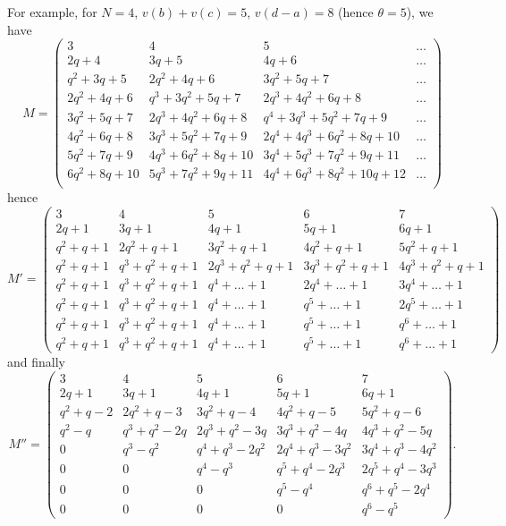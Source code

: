 \begin{example}
  For example, for $N = 4$, $v(b)+v(c)=5$, $v(d-a) = 8$ (hence $\theta=5$), we have
  \[ M = \begin{pmatrix}
    3 & 4 & 5 & \dots \\
    2q + 4 & 3q + 5 & 4q + 6 & \dots \\
    q^{2} + 3q + 5 & 2q^{2} + 4q + 6 & 3q^{2} + 5q + 7 & \dots \\
    2q^{2} + 4q + 6 & q^{3} + 3q^{2} + 5q + 7 & 2q^{3} + 4q^{2} + 6q + 8 & \dots \\
    3q^{2} + 5q + 7 & 2q^{3} + 4q^{2} + 6q + 8 & q^{4} + 3q^{3} + 5q^{2} + 7q + 9 & \dots \\
    4q^{2} + 6q + 8 & 3q^{3} + 5q^{2} + 7q + 9 & 2q^{4} + 4q^{3} + 6q^{2} + 8q + 10 & \dots \\
    5q^{2} + 7q + 9 & 4q^{3} + 6q^{2} + 8q + 10 & 3q^{4} + 5q^{3} + 7q^{2} + 9q + 11 & \dots \\
    6q^{2} + 8q + 10 & 5q^{3} + 7q^{2} + 9q + 11 & 4q^{4} + 6q^{3} + 8q^{2} + 10q + 12 & \dots \\
    \end{pmatrix} \]
  hence
  \[ M' = \begin{pmatrix}
    3 & 4 & 5 & 6 & 7 \\
    2q + 1 & 3q + 1 & 4q + 1 & 5q + 1 & 6q + 1 \\
    q^{2} + q + 1 & 2q^{2} + q + 1 & 3q^{2} + q + 1 & 4q^{2} + q + 1 & 5q^{2} + q + 1 \\
    q^{2} + q + 1 & q^{3} + q^{2} + q + 1 & 2q^{3} + q^{2} + q + 1 & 3q^{3} + q^{2} + q + 1 & 4q^{3} + q^{2} + q + 1 \\
    q^{2} + q + 1 & q^{3} + q^{2} + q + 1 & q^{4} + \dots + 1 & 2q^{4} + \dots + 1 & 3q^{4} + \dots + 1 \\
    q^{2} + q + 1 & q^{3} + q^{2} + q + 1 & q^{4} + \dots + 1 & q^{5} + \dots + 1 & 2q^{5} + \dots + 1 \\
    q^{2} + q + 1 & q^{3} + q^{2} + q + 1 & q^{4} + \dots + 1 & q^{5} + \dots + 1 & q^{6} + \dots + 1 \\
    q^{2} + q + 1 & q^{3} + q^{2} + q + 1 & q^{4} + \dots + 1 & q^{5} + \dots + 1 & q^{6} + \dots + 1
    \end{pmatrix} \]
  and finally
  \[ M'' = \begin{pmatrix}
    3 & 4 & 5 & 6 & 7 \\
    2q + 1 & 3q + 1 & 4q + 1 & 5q + 1 & 6q + 1 \\
    q^{2} + q - 2 & 2q^{2} + q - 3 & 3q^{2} + q - 4 & 4q^{2} + q - 5 & 5q^{2} + q - 6 \\
    q^{2} - q & q^{3} + q^{2} - 2q & 2q^{3} + q^{2} - 3q & 3q^{3} + q^{2} - 4q & 4q^{3} + q^{2} - 5q \\
    0 & q^{3} - q^{2} & q^{4} + q^{3} - 2q^{2} & 2q^{4} + q^{3} - 3q^{2} & 3q^{4} + q^{3} - 4q^{2} \\
    0 & 0 & q^{4} - q^{3} & q^{5} + q^{4} - 2q^{3} & 2q^{5} + q^{4} - 3q^{3} \\
    0 & 0 & 0 & q^{5} - q^{4} & q^{6} + q^{5} - 2q^{4} \\
    0 & 0 & 0 & 0 & q^{6} - q^{5}
    \end{pmatrix}. \]
\end{example}

